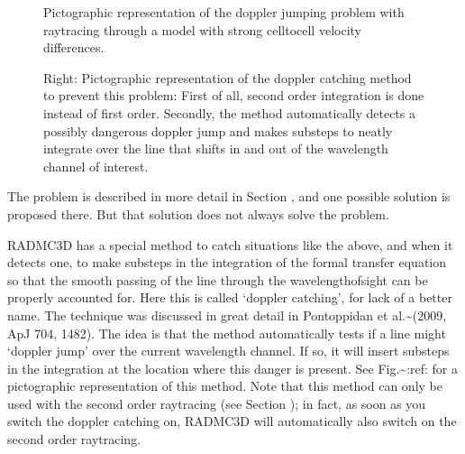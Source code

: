 \documentclass[letterpaper,10pt,english]{sphinxmanual}
\begin{document}
\begin{figure}[htbp]
\centering
\capstart

\noindent{}
\caption{Pictographic representation of the doppler jumping problem with
ray\sphinxhyphen{}tracing through a model with strong cell\sphinxhyphen{}to\sphinxhyphen{}cell velocity differences.}\label{\detokenize{lineradtrans:id1}}\label{\detokenize{lineradtrans:fig-doppler-jump}}\end{figure}

\begin{figure}[htbp]
\centering
\capstart

\noindent{}
\caption{Right: Pictographic representation of the doppler catching method to
prevent this problem: First of all, second order integration is done
instead of first order. Secondly, the method automatically detects a
possibly dangerous doppler jump and makes sub\sphinxhyphen{}steps to neatly integrate
over the line that shifts in\sphinxhyphen{} and out of the wavelength channel of
interest.}\label{\detokenize{lineradtrans:id2}}\label{\detokenize{lineradtrans:fig-doppler-catch}}\end{figure}

The problem is described in more detail in Section {\hyperref[\detokenize{imagesspectra:sec-wavelength-bands}]{}},
and one possible solution is proposed there.  But that solution does not always
solve the problem.

RADMC\sphinxhyphen{}3D has a special method to catch situations like the above, and when
it detects one, to make sub\sphinxhyphen{}steps in the integration of the formal transfer
equation so that the smooth passing of the line through the
wavelength\sphinxhyphen{}of\sphinxhyphen{}sight can be properly accounted for. Here this is called
‘doppler catching’, for lack of a better name. The technique was discussed
in great detail in Pontoppidan et al.\textasciitilde{}(2009, ApJ 704, 1482). The idea is
that the method automatically tests if a line might ‘doppler jump’ over
the current wavelength channel. If so, it will insert substeps in the
integration at the location where this danger is present. See
Fig.\textasciitilde{}:ref: for a pictographic representation of this
method. Note that this method can only be used with the second order
ray\sphinxhyphen{}tracing (see Section {\hyperref[\detokenize{imagesspectra:sec-second-order}]{}}); in fact, as soon as you
switch the doppler catching on, RADMC\sphinxhyphen{}3D will automatically also switch on
the second order ray\sphinxhyphen{}tracing.
\end{document}
